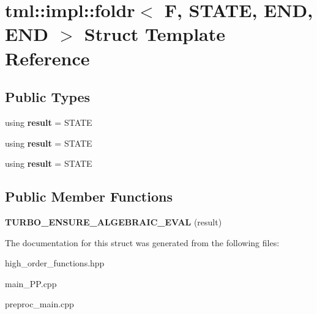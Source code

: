 \hypertarget{structtml_1_1impl_1_1foldr_3_01F_00_01STATE_00_01END_00_01END_01_4}{\section{tml\+:\+:impl\+:\+:foldr$<$ F, S\+T\+A\+T\+E, E\+N\+D, E\+N\+D $>$ Struct Template Reference}
\label{structtml_1_1impl_1_1foldr_3_01F_00_01STATE_00_01END_00_01END_01_4}
}
\subsection*{Public Types}
\begin{DoxyCompactItemize}
\item 
\hypertarget{structtml_1_1impl_1_1foldr_3_01F_00_01STATE_00_01END_00_01END_01_4_a6f78e30bde2fd079eeb9f26bcd66ac66}{using {\bfseries result} = S\+T\+A\+T\+E}\label{structtml_1_1impl_1_1foldr_3_01F_00_01STATE_00_01END_00_01END_01_4_a6f78e30bde2fd079eeb9f26bcd66ac66}

\item 
\hypertarget{structtml_1_1impl_1_1foldr_3_01F_00_01STATE_00_01END_00_01END_01_4_a6f78e30bde2fd079eeb9f26bcd66ac66}{using {\bfseries result} = S\+T\+A\+T\+E}\label{structtml_1_1impl_1_1foldr_3_01F_00_01STATE_00_01END_00_01END_01_4_a6f78e30bde2fd079eeb9f26bcd66ac66}

\item 
\hypertarget{structtml_1_1impl_1_1foldr_3_01F_00_01STATE_00_01END_00_01END_01_4_a6f78e30bde2fd079eeb9f26bcd66ac66}{using {\bfseries result} = S\+T\+A\+T\+E}\label{structtml_1_1impl_1_1foldr_3_01F_00_01STATE_00_01END_00_01END_01_4_a6f78e30bde2fd079eeb9f26bcd66ac66}

\end{DoxyCompactItemize}
\subsection*{Public Member Functions}
\begin{DoxyCompactItemize}
\item 
\hypertarget{structtml_1_1impl_1_1foldr_3_01F_00_01STATE_00_01END_00_01END_01_4_a558ee332078ee1ae1bcf11e35f7961b6}{{\bfseries T\+U\+R\+B\+O\+\_\+\+E\+N\+S\+U\+R\+E\+\_\+\+A\+L\+G\+E\+B\+R\+A\+I\+C\+\_\+\+E\+V\+A\+L} (result)}\label{structtml_1_1impl_1_1foldr_3_01F_00_01STATE_00_01END_00_01END_01_4_a558ee332078ee1ae1bcf11e35f7961b6}

\end{DoxyCompactItemize}


The documentation for this struct was generated from the following files\+:\begin{DoxyCompactItemize}
\item 
high\+\_\+order\+\_\+functions.\+hpp\item 
main\+\_\+\+P\+P.\+cpp\item 
preproc\+\_\+main.\+cpp\end{DoxyCompactItemize}
